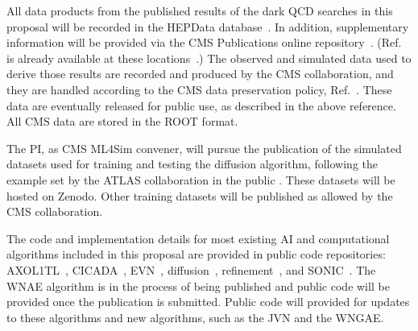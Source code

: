 All data products from the published results of the dark QCD searches in this proposal will be recorded in the HEPData database~\cite{Maguire:2017ypu}.
In addition, supplementary information will be provided via the CMS Publications online repository~\cite{cmspub}.
(Ref.~\cite{CMS:2021dzg} is already available at these locations~\cite{hepdata,EXO-19-020}.)
The observed and simulated data used to derive those results are recorded and produced by the CMS collaboration,
and they are handled according to the CMS data preservation policy, Ref.~\cite{cmsdata}.
These data are eventually released for public use, as described in the above reference.
All CMS data are stored in the ROOT format.

The PI, as CMS ML4Sim convener, will pursue the publication of the simulated datasets used for training and testing the diffusion algorithm,
following the example set by the ATLAS collaboration in the public \challenge.
These datasets will be hosted on Zenodo.
Other training datasets will be published as allowed by the CMS collaboration.

The code and implementation details for most existing AI and computational algorithms included in this proposal are provided in public code repositories:
AXOL1TL~\cite{AXOL1TL:repo}, CICADA~\cite{CICADA:repo}, EVN~\cite{EVN:repo}, diffusion~\cite{CaloDiffusion:repo}, refinement~\cite{Refinement:repo}, and SONIC~\cite{SONIC:repo}.
The WNAE algorithm is in the process of being published and public code will be provided once the publication is submitted.
Public code will provided for updates to these algorithms and new algorithms, such as the JVN and the WNGAE.
